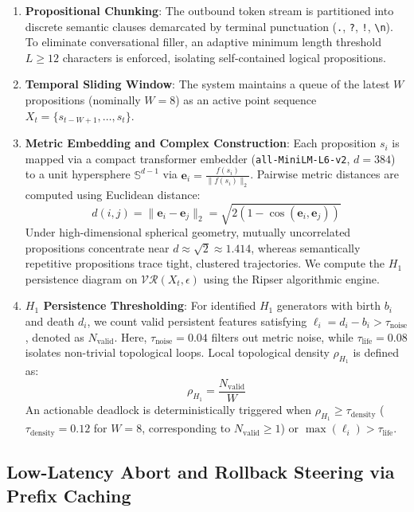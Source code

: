 \documentclass[11pt,a4paper]{article}
\begin{document}
\begin{enumerate}
    \item \textbf{Propositional Chunking}: The outbound token stream is partitioned into discrete semantic clauses demarcated by terminal punctuation (\texttt{.}, \texttt{?}, \texttt{!}, \texttt{\textbackslash n}). To eliminate conversational filler, an adaptive minimum length threshold $L \ge 12$ characters is enforced, isolating self-contained logical propositions.
    \item \textbf{Temporal Sliding Window}: The system maintains a queue of the latest $W$ propositions (nominally $W=8$) as an active point sequence $X_t = \{s_{t-W+1}, \dots, s_t\}$.
    \item \textbf{Metric Embedding and Complex Construction}: Each proposition $s_i$ is mapped via a compact transformer embedder (\texttt{all-MiniLM-L6-v2}, $d=384$) to a unit hypersphere $\mathbb{S}^{d-1}$ via $\mathbf{e}_i = \frac{f(s_i)}{\|f(s_i)\|_2}$. Pairwise metric distances are computed using Euclidean distance:
    \begin{equation}
    d(i, j) = \|\mathbf{e}_i - \mathbf{e}_j\|_2 = \sqrt{2(1 - \cos(\mathbf{e}_i, \mathbf{e}_j))}
    \end{equation}
    Under high-dimensional spherical geometry, mutually uncorrelated propositions concentrate near $d \approx \sqrt{2} \approx 1.414$, whereas semantically repetitive propositions trace tight, clustered trajectories. We compute the $H_1$ persistence diagram on $\mathcal{VR}(X_t, \epsilon)$ using the Ripser algorithmic engine.
    \item \textbf{$H_1$ Persistence Thresholding}: For identified $H_1$ generators with birth $b_i$ and death $d_i$, we count valid persistent features satisfying $\ell_i = d_i - b_i > \tau_{\mathrm{noise}}$, denoted as $N_{\mathrm{valid}}$. Here, $\tau_{\mathrm{noise}} = 0.04$ filters out metric noise, while $\tau_{\mathrm{life}} = 0.08$ isolates non-trivial topological loops. Local topological density $\rho_{H_1}$ is defined as:
    \begin{equation}
    \rho_{H_1} = \frac{N_{\mathrm{valid}}}{W}
    \end{equation}
    An actionable deadlock is deterministically triggered when $\rho_{H_1} \ge \tau_{\mathrm{density}}$ ($\tau_{\mathrm{density}} = 0.12$ for $W=8$, corresponding to $N_{\mathrm{valid}} \ge 1$) or $\max(\ell_i) > \tau_{\mathrm{life}}$.
\end{enumerate}

\subsection{Low-Latency Abort and Rollback Steering via Prefix Caching}
\end{document}
